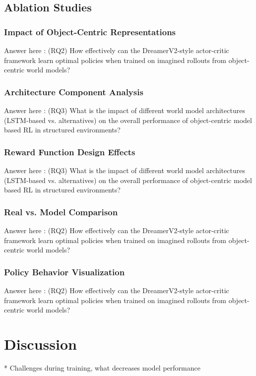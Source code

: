 \documentclass[
	english,
	ruledheaders=section,
	class=report,
	thesis={type=master},
	accentcolor=9c,
	custommargins=true,
	marginpar=false,
	parskip=half-,
	fontsize=11pt,
]{tudapub}
\begin{document}
\section{Ablation Studies}
\label{sec:ablation_studies}

\subsection{Impact of Object-Centric Representations}
\label{subsec:oc_impact}
Answer here : (RQ2) How effectively can the DreamerV2-style actor-critic framework learn optimal policies when trained on imagined rollouts from object-centric world models?

\subsection{Architecture Component Analysis}
\label{subsec:architecture_analysis}
Answer here : (RQ3) What is the impact of different world model architectures (LSTM-based vs. alternatives) on the overall performance of object-centric model based RL in structured environments?

\subsection{Reward Function Design Effects}
\label{subsec:reward_effects}
Answer here : (RQ3) What is the impact of different world model architectures (LSTM-based vs. alternatives) on the overall performance of object-centric model based RL in structured environments?

\subsection{Real vs. Model Comparison}
\label{subsec:real_vs_model}
Answer here : (RQ2) How effectively can the DreamerV2-style actor-critic framework learn optimal policies when trained on imagined rollouts from object-centric world models?

\subsection{Policy Behavior Visualization}
\label{subsec:policy_visualization}
Answer here : (RQ2) How effectively can the DreamerV2-style actor-critic framework learn optimal policies when trained on imagined rollouts from object-centric world models?

\chapter{Discussion}
\label{chap:discussion}
* Challenges during training, what decreases model performance
\end{document}
